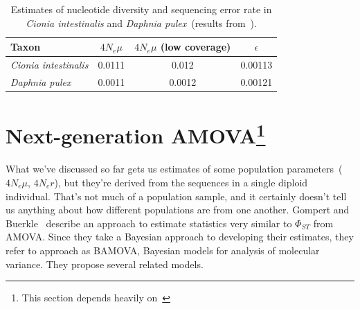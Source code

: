 \begin{table}
\begin{center}
\begin{tabular}{lccc}
\hline\hline
Taxon & $4N_e\mu$ & $4N_e\mu$ (low coverage) & $\epsilon$ \\
\hline
{\it Cionia intestinalis} & 0.0111 & 0.012 & 0.00113 \\
{\it Daphnia pulex} & 0.0011 & 0.0012 & 0.00121 \\
\hline
\end{tabular}
\end{center}
\caption{Estimates of nucleotide diversity and sequencing error rate
  in {\it Cionia intestinalis\/} and {\it Daphnia pulex}~(results
  from~\cite{Haubold-etal-2010}).}\label{table:NGS-results}
\end{table}

\section*{Next-generation AMOVA\footnote{This section depends heavily on~\cite{Gompert-Buerkle-2011}}}

What we've discussed so far gets us estimates of some population
parameters~($4N_e\mu$, $4N_er$), but they're derived from the
sequences in a single diploid individual. That's not much of a
population sample, and it certainly doesn't tell us anything about how
different populations are from one another. Gompert and
Buerkle~\cite{Gompert-Buerkle-2011} describe an approach to estimate
statistics very similar to $\Phi_{ST}$ from AMOVA. Since they take a
Bayesian approach to developing their estimates, they refer to
approach as BAMOVA, Bayesian models for analysis of molecular
variance. They propose several related models.

